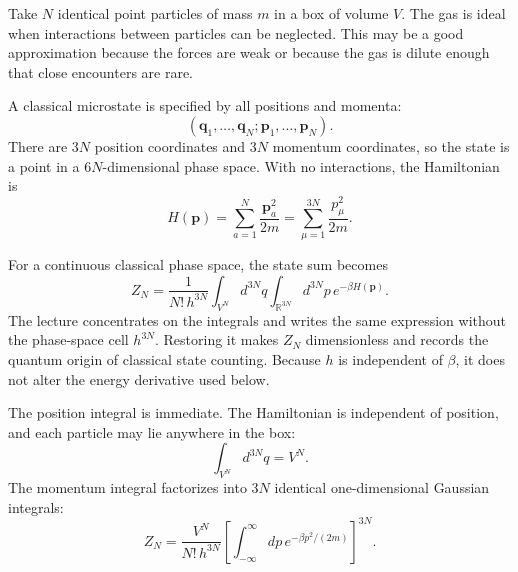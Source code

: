 Take \(N\) identical point particles of mass \(m\) in a box of volume
\(V\).  The gas is ideal when interactions between particles can be
neglected.  This may be a good approximation because the forces are weak
or because the gas is dilute enough that close encounters are rare.

A classical microstate is specified by all positions and momenta:
\begin{equation}
 (\bm q_1,\ldots,\bm q_N;\bm p_1,\ldots,\bm p_N).
\end{equation}
There are \(3N\) position coordinates and \(3N\) momentum coordinates, so
the state is a point in a \(6N\)-dimensional phase space.  With no
interactions, the Hamiltonian is
\begin{equation}
 H(\bm p)=\sum_{a=1}^{N}\frac{\bm p_a^2}{2m}
 =\sum_{\mu=1}^{3N}\frac{p_\mu^2}{2m}.
 \label{eq:sm4-ideal-hamiltonian}
\end{equation}

\begin{classroomqa}
\end{classroomqa}

For a continuous classical phase space, the state sum becomes
\begin{equation}
 Z_N
 =\frac{1}{N!\,h^{3N}}
 \int_{V^N}d^{3N}q
 \int_{\mathbb R^{3N}}d^{3N}p\,
 e^{-\beta H(\bm p)}.
 \label{eq:sm4-classical-partition}
\end{equation}
The lecture concentrates on the integrals and writes the same expression
without the phase-space cell \(h^{3N}\).  Restoring it makes \(Z_N\)
dimensionless and records the quantum origin of classical state counting.
Because \(h\) is independent of \(\beta\), it does not alter the energy
derivative used below.

The position integral is immediate.  The Hamiltonian is independent of
position, and each particle may lie anywhere in the box:
\begin{equation}
 \int_{V^N}d^{3N}q=V^N.
\end{equation}
The momentum integral factorizes into \(3N\) identical one-dimensional
Gaussian integrals:
\begin{equation}
 Z_N
 =\frac{V^N}{N!\,h^{3N}}
 \left[
  \int_{-\infty}^{\infty}dp\,
  e^{-\beta p^2/(2m)}
 \right]^{3N}.
 \label{eq:sm4-factorized-gas}
\end{equation}

